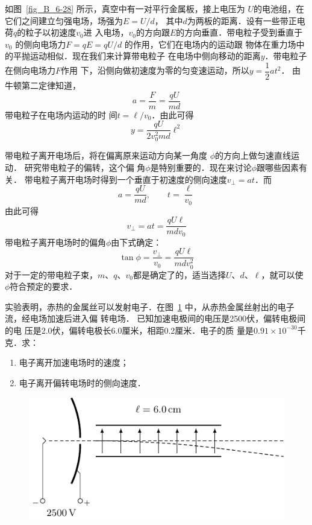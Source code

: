 如图~\ref{fig_B_6-28} 所示，真空中有一对平行金属板，接上电压为
$U$的电池组，在它们之间建立匀强电场，场强为$E=U/d$，
其中$d$为两板的距离．设有一些带正电荷$q$的粒子以初速度$v_0$进
入电场，$v_0$的方向跟$E$的方向垂直．带电粒子受到垂直于$v_0$
的侧向电场力$F=qE=qU/d$
的作用，它们在电场内的运动跟
物体在重力场中的平抛运动相似．现在我们来计算带电粒子
在电场中侧向移动的距离$y$．带电粒子在侧向电场力$F$作用
下，沿侧向做初速度为零的匀变速运动，所以$y=\dfrac{1}{2}at^2$．
由牛顿第二定律知道，
\[a=\frac{F}{m}=\frac{qU}{md} \]
带电粒子在电场内运动的时
间$t=\ell/v_0$．由此可得
\[y=\frac{qU}{2v^2_0 md}\ell^2 \]

带电粒子离开电场后，将在偏离原来运动方向某一角度
$\phi$的方向上做匀速直线运动．
研究带电粒子的偏转，这个偏
角$\phi$是特别重要的．现在来讨论$\phi$跟哪些因素有关．
带电粒子离开电场时得到一个垂直于初速度的侧向速度$v_{\bot}=at$．而
\[a=\frac{qU}{md},\qquad t=\frac{\ell}{v_0} \]
由此可得
\[v_{\bot}=at=\frac{qU\ell}{mdv_0} \]
带电粒子离开电场时的偏角$\phi$由下式确定：
\[\tan\phi=\frac{v_{\bot}}{v_0}=\frac{qU\ell}{mdv^2_0} \]
对于一定的带电粒子束，$m$、$q$、$v_0$都是确定了的，适当选择$U$、$d$、$\ell$，就可以使
$\phi$符合预定的要求．

\begin{example}
实验表明，赤热的金属丝可以发射电子．在图~\ref{fig_B_6-29} 
中，从赤热金属丝射出的电子流，经电场加速后进入偏
转电场．
已知加速电极间的电压是2500伏，偏转电极间的电
压是2.0伏，偏转电极长6.0厘米，相距0.2厘米．电子的质
量是$0.91\times10^{-30}$千克．求：
\begin{enumerate}
    \item 电子离开加速电场时的速度；
    \item 电子离开偏转电场时的侧向速度．
\end{enumerate}
\begin{figure}[htbp]
	\centering
	\includegraphics{fig/B/6-29.pdf}
	\caption{}\label{fig_B_6-29}
\end{figure}

\end{example}


